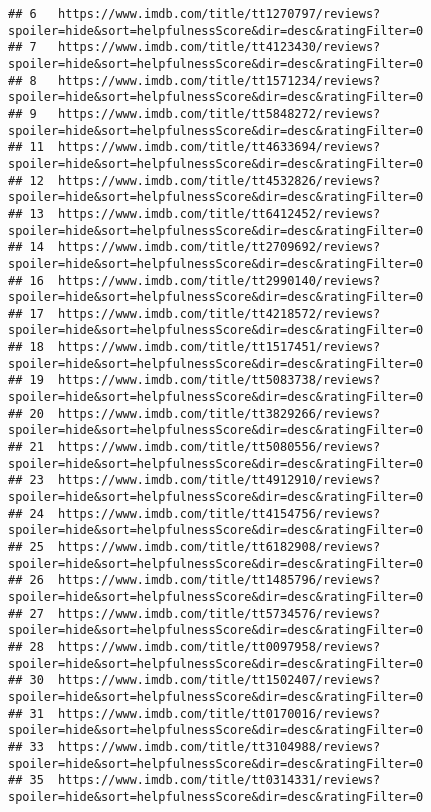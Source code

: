 \documentclass[]{article}
\begin{document}
\begin{verbatim}
## 6   https://www.imdb.com/title/tt1270797/reviews?spoiler=hide&sort=helpfulnessScore&dir=desc&ratingFilter=0
## 7   https://www.imdb.com/title/tt4123430/reviews?spoiler=hide&sort=helpfulnessScore&dir=desc&ratingFilter=0
## 8   https://www.imdb.com/title/tt1571234/reviews?spoiler=hide&sort=helpfulnessScore&dir=desc&ratingFilter=0
## 9   https://www.imdb.com/title/tt5848272/reviews?spoiler=hide&sort=helpfulnessScore&dir=desc&ratingFilter=0
## 11  https://www.imdb.com/title/tt4633694/reviews?spoiler=hide&sort=helpfulnessScore&dir=desc&ratingFilter=0
## 12  https://www.imdb.com/title/tt4532826/reviews?spoiler=hide&sort=helpfulnessScore&dir=desc&ratingFilter=0
## 13  https://www.imdb.com/title/tt6412452/reviews?spoiler=hide&sort=helpfulnessScore&dir=desc&ratingFilter=0
## 14  https://www.imdb.com/title/tt2709692/reviews?spoiler=hide&sort=helpfulnessScore&dir=desc&ratingFilter=0
## 16  https://www.imdb.com/title/tt2990140/reviews?spoiler=hide&sort=helpfulnessScore&dir=desc&ratingFilter=0
## 17  https://www.imdb.com/title/tt4218572/reviews?spoiler=hide&sort=helpfulnessScore&dir=desc&ratingFilter=0
## 18  https://www.imdb.com/title/tt1517451/reviews?spoiler=hide&sort=helpfulnessScore&dir=desc&ratingFilter=0
## 19  https://www.imdb.com/title/tt5083738/reviews?spoiler=hide&sort=helpfulnessScore&dir=desc&ratingFilter=0
## 20  https://www.imdb.com/title/tt3829266/reviews?spoiler=hide&sort=helpfulnessScore&dir=desc&ratingFilter=0
## 21  https://www.imdb.com/title/tt5080556/reviews?spoiler=hide&sort=helpfulnessScore&dir=desc&ratingFilter=0
## 23  https://www.imdb.com/title/tt4912910/reviews?spoiler=hide&sort=helpfulnessScore&dir=desc&ratingFilter=0
## 24  https://www.imdb.com/title/tt4154756/reviews?spoiler=hide&sort=helpfulnessScore&dir=desc&ratingFilter=0
## 25  https://www.imdb.com/title/tt6182908/reviews?spoiler=hide&sort=helpfulnessScore&dir=desc&ratingFilter=0
## 26  https://www.imdb.com/title/tt1485796/reviews?spoiler=hide&sort=helpfulnessScore&dir=desc&ratingFilter=0
## 27  https://www.imdb.com/title/tt5734576/reviews?spoiler=hide&sort=helpfulnessScore&dir=desc&ratingFilter=0
## 28  https://www.imdb.com/title/tt0097958/reviews?spoiler=hide&sort=helpfulnessScore&dir=desc&ratingFilter=0
## 30  https://www.imdb.com/title/tt1502407/reviews?spoiler=hide&sort=helpfulnessScore&dir=desc&ratingFilter=0
## 31  https://www.imdb.com/title/tt0170016/reviews?spoiler=hide&sort=helpfulnessScore&dir=desc&ratingFilter=0
## 33  https://www.imdb.com/title/tt3104988/reviews?spoiler=hide&sort=helpfulnessScore&dir=desc&ratingFilter=0
## 35  https://www.imdb.com/title/tt0314331/reviews?spoiler=hide&sort=helpfulnessScore&dir=desc&ratingFilter=0

\end{verbatim}
\end{document}
